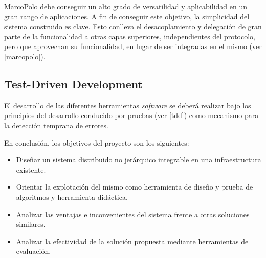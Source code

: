 MarcoPolo debe conseguir un alto grado de versatilidad y aplicabilidad en un gran rango de aplicaciones. A fin de conseguir este objetivo, la simplicidad del sistema construido es clave. Esto conlleva el desacoplamiento y delegación de gran parte de la funcionalidad a otras capas superiores, independientes del protocolo, pero que aprovechan su funcionalidad, en lugar de ser integradas en el mismo (ver \ref{marcopolo}).

\subsection{Test-Driven Development}

El desarrollo de las diferentes herramientas \textit{software} se deberá realizar bajo los principios del desarrollo conducido por pruebas (ver \ref{tdd}) como mecanismo para la detección temprana de errores.

\vspace{2cm}

En conclusión, los objetivos del proyecto son los siguientes:

\begin{center}
\itshape
\begin{itemize}
	\item[] Diseñar un sistema distribuido no jerárquico integrable en una infraestructura existente.
	\item[] Orientar la explotación del mismo como herramienta de diseño y prueba de algoritmos y herramienta didáctica.
	\item[] Analizar las ventajas e inconvenientes del sistema frente a otras soluciones similares.
	\item[] Analizar la efectividad de la solución propuesta mediante herramientas de evaluación.
\end{itemize}
\end{center}